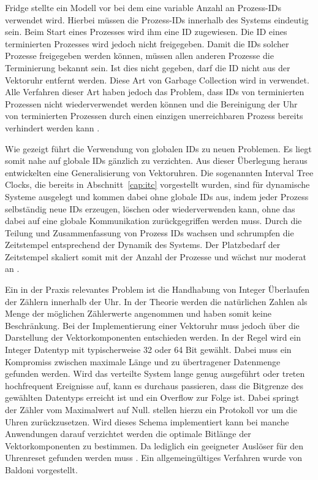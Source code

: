 Fridge \cite{fidge1991logical} stellte ein Modell vor bei dem eine variable Anzahl an Prozess-IDs verwendet wird.
Hierbei müssen die Prozess-IDs innerhalb des Systems eindeutig sein.
Beim Start eines Prozesses wird ihm eine ID zugewiesen.
Die ID eines terminierten Prozesses wird jedoch nicht freigegeben.
Damit die IDs solcher Prozesse freigegeben werden können, müssen allen anderen Prozesse die Terminierung bekannt sein.
Ist dies nicht gegeben, darf die ID nicht aus der Vektoruhr entfernt werden.
Diese Art von Garbage Collection wird in \cite{richard1998efficient} verwendet.
Alle Verfahren dieser Art haben jedoch das Problem, dass IDs von terminierten Prozessen nicht wiederverwendet werden können und die Bereinigung der Uhr von terminierten Prozessen durch einen einzigen unerreichbaren Prozess bereits verhindert werden kann \cite{almeida2008treeclocks}.


Wie gezeigt führt die Verwendung von globalen IDs zu neuen Problemen.
Es liegt somit nahe auf globale IDs gänzlich zu verzichten.
Aus dieser Überlegung heraus entwickelten  \cite{almeida2008treeclocks} eine Generalisierung von Vektoruhren.
Die sogenannten Interval Tree Clocks, die bereits in Abschnitt~\ref{cap:itc} vorgestellt wurden, sind für dynamische Systeme ausgelegt und kommen dabei ohne globale IDs aus, indem jeder Prozess selbständig neue IDs erzeugen, löschen oder wiederverwenden kann, ohne das dabei auf eine globale Kommunikation zurückgegriffen werden muss.
Durch die Teilung und Zusammenfassung von Prozess IDs wachsen und schrumpfen die Zeitstempel entsprechend der Dynamik des Systems.
Der Platzbedarf der Zeitstempel skaliert somit mit der Anzahl der Prozesse und wächst nur moderat an \cite{almeida2008treeclocks}.


Ein in der Praxis relevantes Problem ist die Handhabung von Integer Überlaufen der Zählern innerhalb der Uhr.
In der Theorie werden die natürlichen Zahlen als Menge der möglichen Zählerwerte angenommen und haben somit keine Beschränkung.
Bei der Implementierung einer Vektoruhr muss jedoch über die Darstellung der Vektorkomponenten entschieden werden.
In der Regel wird ein Integer Datentyp mit typischerweise 32 oder 64 Bit gewählt.
Dabei muss ein Kompromiss zwischen maximale Länge und zu übertragener Datenmenge gefunden werden.
Wird das verteilte System lange genug ausgeführt oder treten hochfrequent Ereignisse auf, kann es durchaus passieren, dass die Bitgrenze des gewählten Datentyps erreicht ist und ein Overflow zur Folge ist.
Dabei springt der Zähler vom Maximalwert auf Null.
 \cite{yen1997resetting} stellen hierzu ein Protokoll vor um die Uhren zurückzusetzen.
Wird dieses Schema implementiert kann bei manche Anwendungen darauf verzichtet werden die optimale Bitlänge der Vektorkomponenten zu bestimmen. Da lediglich ein geeigneter Auslöser für den Uhrenreset gefunden werden muss \cite{yen1997resetting}.
Ein allgemeingültiges Verfahren wurde von Baldoni \cite{baldoni1998positive} vorgestellt.

